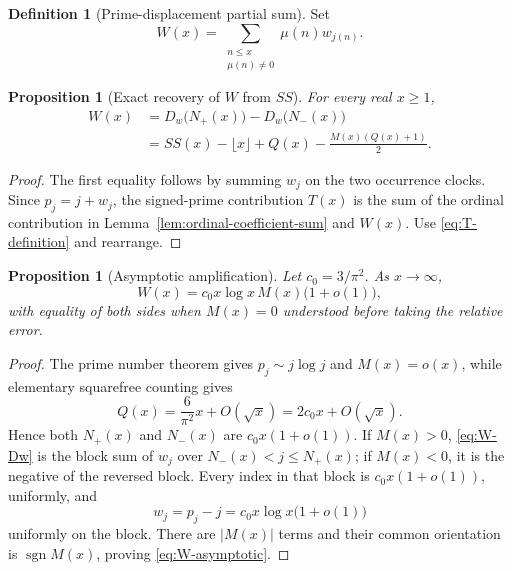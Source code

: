 \documentclass[11pt]{amsart}
\numberwithin{equation}{section}
\theoremstyle{plain}
\newtheorem{proposition}[theorem]{Proposition}
\theoremstyle{definition}
\newtheorem{definition}[theorem]{Definition}
\theoremstyle{remark}
\newcommand{\sgn}{\operatorname{sgn}}
\begin{document}
\begin{definition}[Prime-displacement partial sum]
\label{def:W-partial-sum}
Set
\begin{equation}
W(x)=\sum_{\substack{n\le x\\ \mu(n)\ne0}}
\mu(n)w_{j(n)}.
\label{eq:W-definition}
\end{equation}
\end{definition}

\begin{proposition}[Exact recovery of $W$ from $SS$]
\label{prop:W-from-SS}
For every real $x\ge1$,
\begin{align}
W(x)&=D_w\bigl(N_+(x)\bigr)-D_w\bigl(N_-(x)\bigr)
\label{eq:W-Dw}\\
&=SS(x)-\lfloor x\rfloor+Q(x)
-\frac{M(x)(Q(x)+1)}2.
\label{eq:W-SS}
\end{align}
\end{proposition}

\begin{proof}
The first equality follows by summing $w_j$ on the two occurrence clocks.
Since $p_j=j+w_j$, the signed-prime contribution $T(x)$ is the sum of the
ordinal contribution in Lemma~\ref{lem:ordinal-coefficient-sum} and $W(x)$.
Use \eqref{eq:T-definition} and rearrange.
\end{proof}

\begin{proposition}[Asymptotic amplification]
\label{prop:W-asymptotic}
Let $c_0=3/\pi^2$.  As $x\to\infty$,
\begin{equation}
W(x)=c_0x\log x\,M(x)\bigl(1+o(1)\bigr),
\label{eq:W-asymptotic}
\end{equation}
with equality of both sides when $M(x)=0$ understood before taking the
relative error.
\end{proposition}

\begin{proof}
The prime number theorem gives $p_j\sim j\log j$ and $M(x)=o(x)$, while
elementary squarefree counting gives
\begin{equation}
Q(x)=\frac6{\pi^2}x+O(\sqrt{x})=2c_0x+O(\sqrt{x}).
\label{eq:Q-asymptotic}
\end{equation}
Hence both $N_+(x)$ and $N_-(x)$ are $c_0x(1+o(1))$.  If $M(x)>0$,
\eqref{eq:W-Dw} is the block sum of $w_j$ over
$N_-(x)<j\le N_+(x)$; if $M(x)<0$, it is the negative of the reversed
block.  Every index in that block is $c_0x(1+o(1))$, uniformly, and
\begin{equation}
w_j=p_j-j=c_0x\log x\bigl(1+o(1)\bigr)
\label{eq:w-uniform-block}
\end{equation}
uniformly on the block.  There are $|M(x)|$ terms and their common orientation
is $\sgn M(x)$, proving \eqref{eq:W-asymptotic}.
\end{proof}
\end{document}
